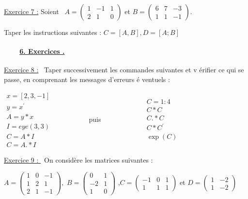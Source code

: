 \documentclass{article}
\begin{document}
\bigskip \underline{Exercice 7 :} Soient \ $A=\left( 
\begin{array}{ccc}
1 & -1 & 1 \\ 
2 & 1 & 0%
\end{array}%
\right) $ et $B=\left( 
\begin{array}{ccc}
6 & 7 & -3 \\ 
1 & 1 & -1%
\end{array}%
\right) .$

Taper les instructions suivantes : $C=\left[ A,B\right] ,D=\left[ A;B\right] 
$

\paragraph{\ \ \ \ \protect\underline{6. Exercices .}}

\underline{Exercice 8 :} \ Taper successivement les commandes suivantes et v%
\'{e}rifier ce qui se passe, en comprenant les messages d'erreurs \'{e}%
ventuels :

$%
\begin{array}{c}
x=\left[ 2,3,-1\right] \\ 
y=x^{\prime } \\ 
A=y\ast x \\ 
I=eye(3,3) \\ 
C=A\ast I \\ 
C=A.\ast I%
\end{array}%
$ \ \ \ \ \ \ \ \ \ \ puis \ \ \ \ \ \ \ \ \ \ \ \ $%
\begin{array}{c}
C=1:4 \\ 
C\ast C \\ 
C.\ast C \\ 
C\ast C^{\prime } \\ 
\exp (C)%
\end{array}%
$

\underline{Exercice 9 : } \ On consid\`{e}re les matrices suivantes :

$A=\left( 
\begin{array}{ccc}
1 & 0 & -1 \\ 
1 & 2 & 1 \\ 
2 & 1 & -1%
\end{array}%
\right) ,$ $B=\left( 
\begin{array}{cc}
0 & 1 \\ 
-2 & 1 \\ 
1 & 0%
\end{array}%
\right) $ ,$C=\left( 
\begin{array}{ccc}
-1 & 0 & 1 \\ 
1 & 1 & 1%
\end{array}%
\right) $ et $D=\left( 
\begin{array}{cc}
1 & -2 \\ 
1 & -2%
\end{array}%
\right) $
\end{document}
